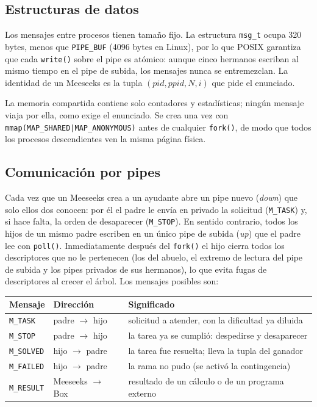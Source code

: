 \documentclass[11pt,letterpaper]{article}
\makeatletter
\newcommand{\codigo}[2]{%
  \edef\lin{\csname line@#1\endcsname}%
  }
\makeatother
\begin{document}
\subsection{Estructuras de datos}

Los mensajes entre procesos tienen tamaño fijo. La estructura \texttt{msg\_t} ocupa 320
bytes, menos que \texttt{PIPE\_BUF} (4096 bytes en Linux), por lo que POSIX garantiza que
cada \texttt{write()} sobre el pipe es atómico: aunque cinco hermanos escriban al mismo
tiempo en el pipe de subida, los mensajes nunca se entremezclan. La identidad de un
Meeseeks es la tupla $(pid, ppid, N, i)$ que pide el enunciado.

\codigo{msg_who}{Identidad de un Meeseeks y formato de los mensajes}

La memoria compartida contiene solo contadores y estadísticas; ningún mensaje viaja por
ella, como exige el enunciado. Se crea una vez con \texttt{mmap(MAP\_SHARED|MAP\_ANONYMOUS)}
antes de cualquier \texttt{fork()}, de modo que todos los procesos descendientes ven la
misma página física.

\codigo{shared}{Región compartida entre todos los procesos}

\subsection{Comunicación por pipes}

Cada vez que un Meeseeks crea a un ayudante abre un pipe nuevo (\emph{down}) que solo
ellos dos conocen: por él el padre le envía en privado la solicitud (\texttt{M\_TASK}) y,
si hace falta, la orden de desaparecer (\texttt{M\_STOP}). En sentido contrario, todos los
hijos de un mismo padre escriben en un único pipe de subida (\emph{up}) que el padre lee con
\texttt{poll()}. Inmediatamente después del \texttt{fork()} el hijo cierra todos los
descriptores que no le pertenecen (los del abuelo, el extremo de lectura del pipe de
subida y los pipes privados de sus hermanos), lo que evita fugas de descriptores al crecer
el árbol. Los mensajes posibles son:

\begin{center}
\begin{tabular}{lll}
\toprule
Mensaje & Dirección & Significado \\
\midrule
\texttt{M\_TASK}   & padre $\to$ hijo & solicitud a atender, con la dificultad ya diluida \\
\texttt{M\_STOP}   & padre $\to$ hijo & la tarea ya se cumplió: despedirse y desaparecer \\
\texttt{M\_SOLVED} & hijo $\to$ padre & la tarea fue resuelta; lleva la tupla del ganador \\
\texttt{M\_FAILED} & hijo $\to$ padre & la rama no pudo (se activó la contingencia) \\
\texttt{M\_RESULT} & Meeseeks $\to$ Box & resultado de un cálculo o de un programa externo \\
\bottomrule
\end{tabular}
\end{center}
\end{document}
